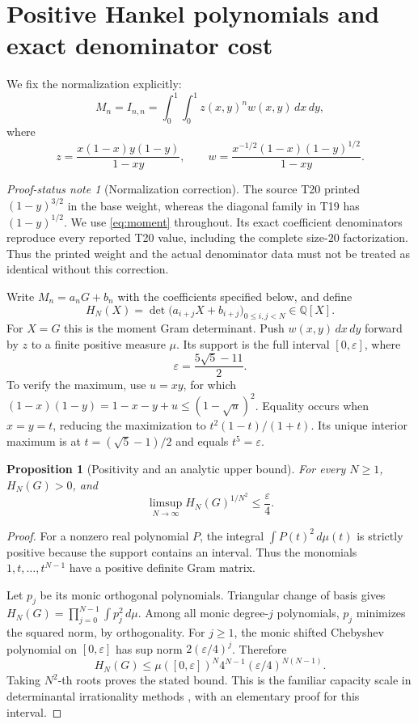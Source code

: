 \documentclass[11pt,a4paper]{article}
\newtheorem{proposition}[theorem]{Proposition}
\theoremstyle{definition}\newtheorem{definition}[theorem]{Definition}
\theoremstyle{remark}\newtheorem{remark}[theorem]{Remark}
\newtheorem{audit}[theorem]{Proof-status note}
\newcommand{\Q}{\mathbb Q}\newcommand{\Z}{\mathbb Z}\newcommand{\N}{\mathbb N}\newcommand{\R}{\mathbb R}\newcommand{\C}{\mathbb C}
\begin{document}
\section{Positive Hankel polynomials and exact denominator cost}\label{sec:hankel}
We fix the normalization explicitly:
\begin{equation}\label{eq:moment}
 M_n=I_{n,n}=\int_0^1\!\int_0^1 z(x,y)^n w(x,y)\,dx\,dy,
\end{equation}
where
\[
 z=\frac{x(1-x)y(1-y)}{1-xy},\qquad
 w=\frac{x^{-1/2}(1-x)(1-y)^{1/2}}{1-xy}.
\]
\begin{audit}[Normalization correction]
The source T20 printed $(1-y)^{3/2}$ in the base weight, whereas the diagonal family in T19 has $(1-y)^{1/2}$. We use \eqref{eq:moment} throughout. Its exact coefficient denominators reproduce every reported T20 value, including the complete size-$20$ factorization. Thus the printed weight and the actual denominator data must not be treated as identical without this correction.
\end{audit}

Write $M_n=a_nG+b_n$ with the coefficients specified below, and define
\[
 H_N(X)=\det\bigl(a_{i+j}X+b_{i+j}\bigr)_{0\le i,j<N}\in\Q[X].
\]
For $X=G$ this is the moment Gram determinant. Push $w(x,y)\,dx\,dy$ forward by $z$ to a finite positive measure $\mu$. Its support is the full interval $[0,\varepsilon]$, where
\[
 \varepsilon=\frac{5\sqrt5-11}{2}.
\]
To verify the maximum, use $u=xy$, for which
$(1-x)(1-y)=1-x-y+u\le(1-\sqrt u)^2$. Equality occurs when $x=y=t$, reducing the maximization to $t^2(1-t)/(1+t)$. Its unique interior maximum is at $t=(\sqrt5-1)/2$ and equals $t^5=\varepsilon$.

\begin{proposition}[Positivity and an analytic upper bound]\label{prop:gram}
For every $N\ge1$, $H_N(G)>0$, and
\[
 \limsup_{N\to\infty}H_N(G)^{1/N^2}\le\frac{\varepsilon}{4}.
\]
\end{proposition}
\begin{proof}
For a nonzero real polynomial $P$, the integral $\int P(t)^2\,d\mu(t)$ is strictly positive because the support contains an interval. Thus the monomials $1,t,\ldots,t^{N-1}$ have a positive definite Gram matrix.

Let $p_j$ be its monic orthogonal polynomials. Triangular change of basis gives
$H_N(G)=\prod_{j=0}^{N-1}\int p_j^2\,d\mu$. Among all monic degree-$j$ polynomials, $p_j$ minimizes the squared norm, by orthogonality. For $j\ge1$, the monic shifted Chebyshev polynomial on $[0,\varepsilon]$ has sup norm $2(\varepsilon/4)^j$. Therefore
\[
 H_N(G)\le\mu([0,\varepsilon])^N4^{N-1}
                  (\varepsilon/4)^{N(N-1)}.
\]
Taking $N^2$-th roots proves the stated bound. This is the familiar capacity scale in determinantal irrationality methods \cite{Z17}, with an elementary proof for this interval.
\end{proof}
\end{document}
